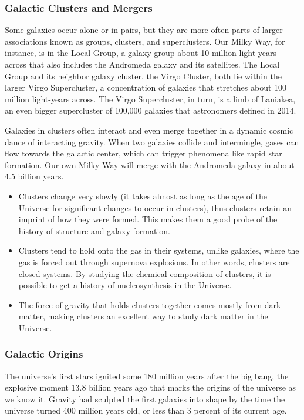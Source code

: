 \documentclass{article}
\begin{document}
\subsubsection{Galactic Clusters and Mergers}
Some galaxies occur alone or in pairs, but they are more often parts of larger associations known as groups, clusters, and superclusters. Our Milky Way, for instance, is in the Local Group, a galaxy group about 10 million light-years across that also includes the Andromeda galaxy and its satellites. The Local Group and its neighbor galaxy cluster, the Virgo Cluster, both lie within the larger Virgo Supercluster, a concentration of galaxies that stretches about 100 million light-years across. The Virgo Supercluster, in turn, is a limb of Laniakea, an even bigger supercluster of 100,000 galaxies that astronomers defined in 2014. \par
\vspace{0.2em}
Galaxies in clusters often interact and even merge together in a dynamic cosmic dance of interacting gravity. When two galaxies collide and intermingle, gases can flow towards the galactic center, which can trigger phenomena like rapid star formation. Our own Milky Way will merge with the Andromeda galaxy in about 4.5 billion years.
\begin{itemize}
    \item Clusters change very slowly (it takes almost as long as the age of the Universe for significant changes to occur in clusters), thus clusters retain an imprint of how they were formed. This makes them a good probe of the history of structure and galaxy formation.
    \item Clusters tend to hold onto the gas in their systems, unlike galaxies, where the gas is forced out through supernova explosions. In other words, clusters are closed systems. By studying the chemical composition of clusters, it is possible to get a history of nucleosynthesis in the Universe.
    \item The force of gravity that holds clusters together comes mostly from dark matter, making clusters an excellent way to study dark matter in the Universe.






\end{itemize}
\subsubsection{Galactic Origins}
The universe's first stars ignited some 180 million years after the big bang, the explosive moment 13.8 billion years ago that marks the origins of the universe as we know it. Gravity had sculpted the first galaxies into shape by the time the universe turned 400 million years old, or less than 3 percent of its current age.
\end{document}
